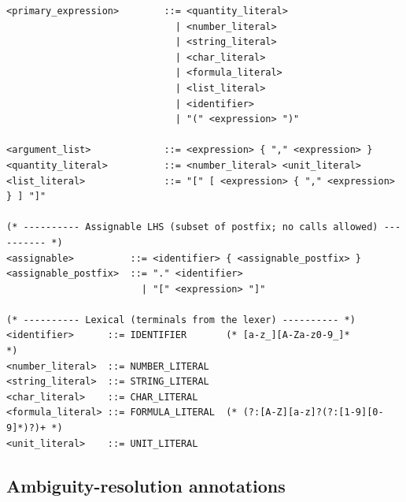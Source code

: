 \documentclass[11pt,a4paper]{article}
\begin{document}
\begin{lstlisting}[style=ebnf]
<primary_expression>        ::= <quantity_literal>
                              | <number_literal>
                              | <string_literal>
                              | <char_literal>
                              | <formula_literal>
                              | <list_literal>
                              | <identifier>
                              | "(" <expression> ")"

<argument_list>             ::= <expression> { "," <expression> }
<quantity_literal>          ::= <number_literal> <unit_literal>
<list_literal>              ::= "[" [ <expression> { "," <expression> } ] "]"

(* ---------- Assignable LHS (subset of postfix; no calls allowed) ---------- *)
<assignable>          ::= <identifier> { <assignable_postfix> }
<assignable_postfix>  ::= "." <identifier>
                        | "[" <expression> "]"

(* ---------- Lexical (terminals from the lexer) ---------- *)
<identifier>      ::= IDENTIFIER       (* [a-z_][A-Za-z0-9_]*           *)
<number_literal>  ::= NUMBER_LITERAL
<string_literal>  ::= STRING_LITERAL
<char_literal>    ::= CHAR_LITERAL
<formula_literal> ::= FORMULA_LITERAL  (* (?:[A-Z][a-z]?(?:[1-9][0-9]*)?)+ *)
<unit_literal>    ::= UNIT_LITERAL
\end{lstlisting}

\subsection{Ambiguity-resolution annotations}
\end{document}
